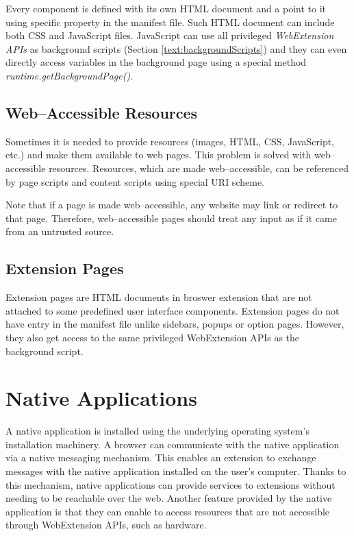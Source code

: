 Every component is defined with its own HTML document and a point to it using specific property in the manifest file. Such HTML document can include both CSS and JavaScript files. JavaScript can use all privileged\textit{ WebExtension APIs} as background scripts (Section \ref{text:backgroundScripts}) and they can even directly access variables in the background page using a special method \textit{runtime.getBackgroundPage()}.

\subsection{Web--Accessible Resources}
Sometimes it is needed to provide resources (images, HTML, CSS, JavaScript, etc.) and make them available to web pages. This problem is solved with web--accessible resources. Resources, which are made web--accessible, can be referenced by page scripts and content scripts using special URI scheme.

Note that if a page is made web--accessible, any website may link or redirect to that page. Therefore, web--accessible pages should treat any input as if it came from an untrusted source.

\subsection{Extension Pages}
Extension pages are HTML documents in broswer extension that are not attached to some predefined user interface components. Extension pages do not have entry in the manifest file unlike sidebars, popups or option pages. However, they also get access to the same privileged WebExtension APIs as the background script.

\section{Native Applications}
A native application is installed using the underlying operating system's installation machinery. A browser can communicate with the native application via a native messaging mechanism. This enables an extension to exchange messages with the native application installed on the user's computer. Thanks to this mechanism, native applications can provide services to extensions without needing to be reachable over the web. Another feature provided by the native application is that they can enable to access resources that are not accessible through WebExtension APIs, such as hardware.

